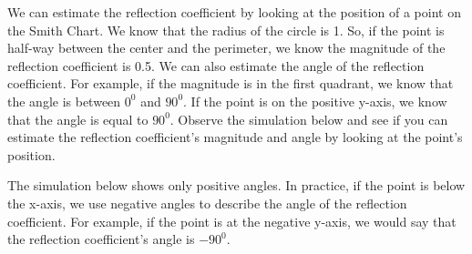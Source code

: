 \documentclass{ximera}
\begin{document}
\begin{example}
We can estimate the reflection coefficient by looking at the position of a point on the Smith Chart. We know that the radius of the circle is 1. So, if the point is half-way between the center and the perimeter, we know the magnitude of the reflection coefficient is 0.5. We can also estimate the angle of the reflection coefficient. For example, if the magnitude is in the first quadrant, we know that the angle is between $0^0$ and $90^0$. If the point is on the positive y-axis, we know that the angle is equal to $90^0$. Observe the simulation below and see if you can estimate the reflection coefficient's magnitude and angle by looking at the point's position. 

The simulation below shows only positive angles. In practice, if the point is below the x-axis, we use negative angles to describe the angle of the reflection coefficient. For example, if the point is at the negative y-axis, we would say that the reflection coefficient's angle is  $-90^0$.

 
\begin{center}  
\end{center} 

\end{example}
\end{document}
